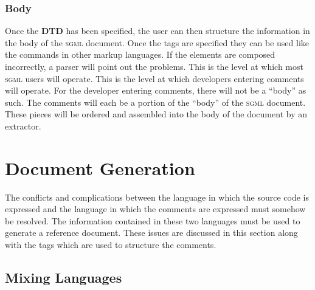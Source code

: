 \subsubsection{Body}

Once the \textbf{DTD} has been specified, the user can then structure the 
information in the body of the \textsc{sgml} document. Once the tags are
specified they can be used like the commands in other markup 
languages. If the elements are composed incorrectly, a parser will
point out the problems. This is the level at which most \textsc{sgml} users
will operate. This is the level at which developers entering comments will
operate. For the developer entering comments, there will not be a ``body'' 
as such. The comments will each be a portion of the ``body'' of the 
\textsc{sgml} document. These pieces will be ordered and assembled into the 
body of the document by an extractor.

\section{Document Generation}

The conflicts and complications between
the language in which the source code is expressed and the language in
which the comments are expressed must somehow be resolved. The information
contained in these two languages must be used to generate a reference
document. These issues are discussed in this section along with the tags 
which are used to structure the comments.

\subsection{Mixing Languages}

